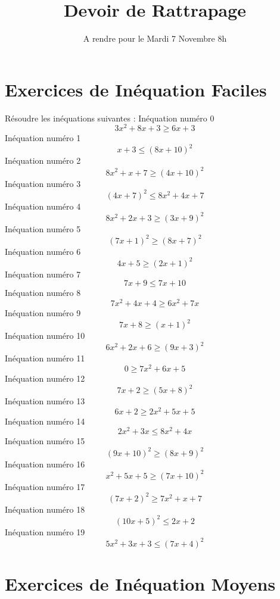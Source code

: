 \documentclass{article}
\title{Devoir de Rattrapage}
\date{A rendre pour le Mardi 7 Novembre 8h}\usepackage{natbib}
\begin{document}
\maketitle
 \section{Exercices de In\'equation Faciles}

 R\'esoudre les in\'equations suivantes : 
In\'equation num\'ero 0 \[3 x^{2} + 8 x + 3 \geq 6 x + 3\]In\'equation num\'ero 1 \[x + 3 \leq \left(8 x + 10\right)^{2}\]In\'equation num\'ero 2 \[8 x^{2} + x + 7 \geq \left(4 x + 10\right)^{2}\]In\'equation num\'ero 3 \[\left(4 x + 7\right)^{2} \leq 8 x^{2} + 4 x + 7\]In\'equation num\'ero 4 \[8 x^{2} + 2 x + 3 \geq \left(3 x + 9\right)^{2}\]In\'equation num\'ero 5 \[\left(7 x + 1\right)^{2} \geq \left(8 x + 7\right)^{2}\]In\'equation num\'ero 6 \[4 x + 5 \geq \left(2 x + 1\right)^{2}\]In\'equation num\'ero 7 \[7 x + 9 \leq 7 x + 10\]In\'equation num\'ero 8 \[7 x^{2} + 4 x + 4 \geq 6 x^{2} + 7 x\]In\'equation num\'ero 9 \[7 x + 8 \geq \left(x + 1\right)^{2}\]In\'equation num\'ero 10 \[6 x^{2} + 2 x + 6 \geq \left(9 x + 3\right)^{2}\]In\'equation num\'ero 11 \[0 \geq 7 x^{2} + 6 x + 5\]In\'equation num\'ero 12 \[7 x + 2 \geq \left(5 x + 8\right)^{2}\]In\'equation num\'ero 13 \[6 x + 2 \geq 2 x^{2} + 5 x + 5\]In\'equation num\'ero 14 \[2 x^{2} + 3 x \leq 8 x^{2} + 4 x\]In\'equation num\'ero 15 \[\left(9 x + 10\right)^{2} \geq \left(8 x + 9\right)^{2}\]In\'equation num\'ero 16 \[x^{2} + 5 x + 5 \geq \left(7 x + 10\right)^{2}\]In\'equation num\'ero 17 \[\left(7 x + 2\right)^{2} \geq 7 x^{2} + x + 7\]In\'equation num\'ero 18 \[\left(10 x + 5\right)^{2} \leq 2 x + 2\]In\'equation num\'ero 19 \[5 x^{2} + 3 x + 3 \leq \left(7 x + 4\right)^{2}\]
 \section{Exercices de In\'equation Moyens}
\end{document}
